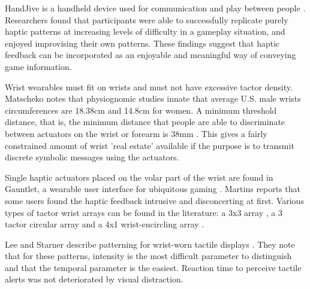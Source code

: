 \documentclass{chi-ext}
\begin{document}

HandJive is a handheld device used for communication and play between people \cite{fogg1998handjive}. Researchers found that participants were able to successfully replicate purely haptic patterns at increasing levels of difficulty in a gameplay situation, and enjoyed improvising their own patterns. These findings suggest that haptic feedback can be incorporated as an enjoyable and meaningful way of conveying game information.

Wrist wearables must fit on wrists and must not have excessive tactor density.  
Matscheko notes that physiognomic studies innate that average U.S. male wrists circumferences are 18.38cm and 14.8cm for women. A minimum threshold distance, that is, the minimum distance that people are able to discriminate between actuators on the wrist or forearm is 38mm \cite{matscheko2010tactor}. This gives a fairly constrained amount of wrist 'real estate' available if the purpose is to transmit discrete symbolic messages using the actuators. 

Single haptic actuators placed on the volar part of the wrist are found in Gauntlet, a wearable user interface for ubiquitous gaming \cite{martins2008gauntlet}. Martins reports that some users found the haptic feedback intrusive and disconcerting at first.  Various types of tactor wrist arrays can be found in the literature:  a 3x3 array \cite{chen2008tactor}, a 3 tactor circular array \cite{lee2010buzzwear} and a 4x1 wrist-encircling array \cite{matscheko2010tactor}.




Lee and Starner describe patterning for wrist-worn tactile displays \cite{lee2010buzzwear}. They note that for these patterns, intensity is the most difficult parameter to distinguish and that the temporal parameter is the easiest. Reaction time to perceive tactile alerts was not deteriorated by visual distraction. 


\end{document}
